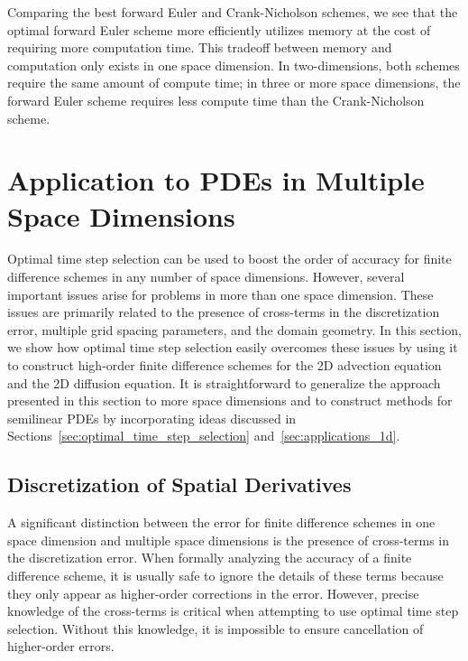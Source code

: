 \documentclass[fleqn,12pt,twoside]{article}
\begin{document}
Comparing the best forward Euler and Crank-Nicholson schemes, we see that
the optimal forward Euler scheme more efficiently utilizes memory at the
cost of requiring more computation time.  This tradeoff between memory and 
computation only exists in one space dimension.  In two-dimensions, both 
schemes require the same amount of compute time; in three or more space 
dimensions, the forward Euler scheme requires less compute time than the
Crank-Nicholson scheme.  


\section{\label{sec:applications_multidim}
         Application to PDEs in Multiple Space Dimensions}
Optimal time step selection can be used to boost the order of accuracy for 
finite difference schemes in any number of space dimensions.  However, 
several important issues arise for problems in more than one space dimension.  
These issues are primarily related to the presence of cross-terms in the 
discretization error, multiple grid spacing parameters,  and the domain 
geometry.  In this section, we show how optimal time step selection easily 
overcomes these issues by using it to construct high-order finite difference
schemes for the 2D advection equation and the 2D diffusion equation.  
It is straightforward to generalize the approach presented in this section to 
more space dimensions and to construct methods for semilinear PDEs by 
incorporating ideas discussed in 
Sections~\ref{sec:optimal_time_step_selection} and~\ref{sec:applications_1d}.  


\subsection{\label{sec:ots_multidim_crossterms}
            Discretization of Spatial Derivatives}
A significant distinction between the error for finite difference schemes in 
one space dimension and multiple space dimensions is the presence of 
cross-terms in the discretization error.  When formally analyzing the accuracy
of a finite difference scheme, it is usually safe to ignore the details of 
these terms because they only appear as higher-order corrections in the error.
However, precise knowledge of the cross-terms is critical when attempting to 
use optimal time step selection.  Without this knowledge, it is impossible to 
ensure cancellation of higher-order errors.  
\end{document}
